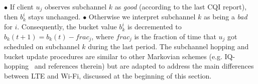 \vskip 2pt
\noindent $\bullet$ If client $u_j$ observes subchannel $k$ as \emph{good} (according to the last CQI report), then $b^{i}_{k}$ stays unchanged.
\vskip 2pt
\noindent $\bullet$ Otherwise we interpret subchannel $k$ as being a \emph{bad} for \eNB $i$. Consequently, the bucket value $b^{i}_{k}$ is decremented to $b_k(t+1) = b_k(t) - frac_j$, where $frac_j$ is the fraction of time that $u_j$ got scheduled on subchannel $k$ during the last period.
\vskip 2pt
The subchannel hopping and bucket update procedures are similar to other Markovian schemes (e.g. IQ-hopping~\cite{iqhop} and references therein) but are adapted to address the main differences between LTE and Wi-Fi, discussed at the beginning of this section.






